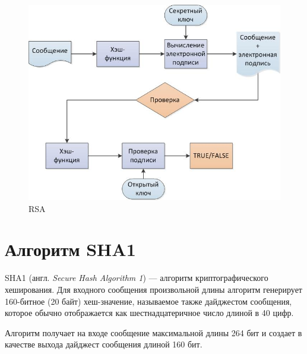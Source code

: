 \begin{figure}[ht!]
	\centering
	\includegraphics[width=0.8\linewidth]{img/rsa-1.jpeg}
	\caption{RSA}
	\label{img:g_function}
\end{figure}

\section{Алгоритм SHA1}

SHA1 (англ. \textit{Secure Hash Algorithm 1}) --- алгоритм криптографического хеширования. Для входного сообщения произвольной длины алгоритм генерирует 160-битное (20 байт) хеш-значение, называемое также дайджестом сообщения, которое обычно отображается как шестнадцатеричное число длиной в 40 цифр.

Алгоритм получает на входе сообщение максимальной длины 264 бит и создает в качестве выхода дайджест сообщения длиной 160 бит.

